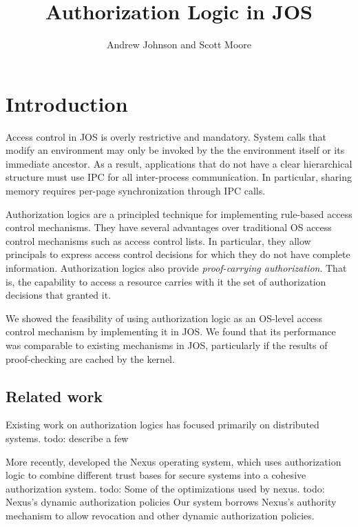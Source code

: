 \documentclass[10pt]{article}
\newcommand{\todo}[1]{{\color{red}todo: {#1}}}
\begin{document}
\title{Authorization Logic in JOS}
\author{Andrew Johnson and Scott Moore}

\maketitle

\thispagestyle{empty}

\section{Introduction}
Access control in JOS is overly restrictive and mandatory. System calls that modify an environment may only be invoked by the the environment itself or its immediate ancestor. As a result, applications that do not have a clear hierarchical structure must use IPC for all inter-process communication. In particular, sharing memory requires per-page synchronization through IPC calls.

Authorization logics are a principled technique for implementing rule-based access control mechanisms.
They have several advantages over traditional OS access control mechanisms such as access control lists.
In particular, they allow principals to express access control decisions for which they do not have complete information.
Authorization logics also provide \emph{proof-carrying authorization}. That is, the capability to access a resource carries with it the set of authorization decisions that granted it.

We showed the feasibility of using authorization logic as an OS-level access control mechanism by implementing it in JOS. We found that its performance was comparable to existing mechanisms in JOS, particularly if the results of proof-checking are cached by the kernel.

\subsection{Related work}
Existing work on authorization logics has focused primarily on distributed systems. \todo{describe a few}

More recently, \citet{Nexus} developed the Nexus operating system, which uses authorization logic to combine different trust bases for secure systems into a cohesive authorization system.
\todo{Some of the optimizations used by nexus}. \todo{Nexus's dynamic authorization policies}
Our system borrows Nexus's authority mechanism to allow revocation and other dynamic authorization policies.
\end{document}
